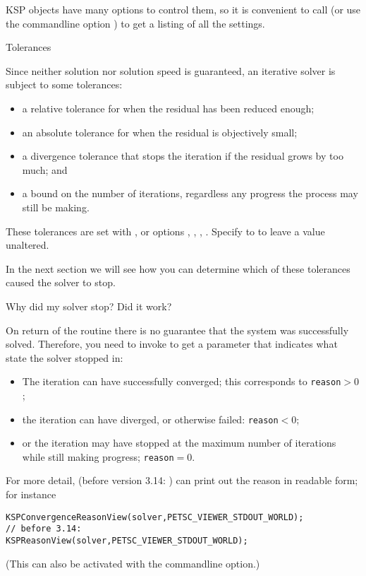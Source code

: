 KSP objects have many options to control them, so it is convenient
to call 
(or use the commandline option )
to get a listing of all the settings.

 {Tolerances}

Since neither
solution nor solution speed is guaranteed, an iterative solver is
subject to some tolerances:
\begin{itemize}
\item a relative tolerance for when the residual has been reduced
  enough;
\item an absolute tolerance for when the residual is objectively
  small;
\item a divergence tolerance that stops the iteration if the residual
  grows by too much; and
\item a bound on the number of iterations, regardless any progress the
  process may still be making.
\end{itemize}

These tolerances are set with ,
or options , ,
, .
Specify to  to leave a value unaltered.

In the next section we will see how you can determine which of these tolerances
caused the solver to stop.

 {Why did my solver stop? Did it work?}
\label{sec:ksp-reason}

On return of the  routine there is no guarantee
that the system was successfully solved.
Therefore, you need to invoke
to get a  parameter that indicates
what state the solver stopped in:
\begin{itemize}
\item The iteration can have successfully converged; this corresponds
  to \lstinline{reason}$>0$;
\item the iteration can have diverged, or otherwise failed: \lstinline{reason}$<0$;
\item or the iteration may have stopped at the maximum number of
  iterations while still making progress; \lstinline{reason}$=0$.
\end{itemize}
For more detail,
(before version 3.14: )
can print out the
reason in readable form; for instance
\begin{lstlisting}
KSPConvergenceReasonView(solver,PETSC_VIEWER_STDOUT_WORLD);
// before 3.14:
KSPReasonView(solver,PETSC_VIEWER_STDOUT_WORLD);
\end{lstlisting}
(This can also be activated with the 
commandline option.)

